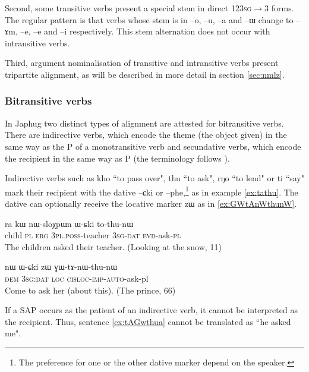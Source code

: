 \documentclass[oldfontcommands,oneside,a4paper,11pt]{article}
\newcommand{\ipa}[1]{{\phon #1}} %
\begin{document}
Second, 
  some transitive verbs present a special stem in direct \textsc{123sg}$\rightarrow$3 forms. The regular pattern is that verbs whose stem is in --\ipa{o}, --\ipa{u}, --\ipa{a} and --\ipa{ɯ} change to --\ipa{ɤm}, --\ipa{e}, --\ipa{e} and --\ipa{i} respectively. This stem alternation does not occur with intransitive verbs.

Third, argument nominalisation of transitive   and intransitive  verbs present tripartite alignment, as will be described in more detail in section  \ref{sec:nmlz}.

\subsubsection{Bitransitive verbs} \label{sec:bitr}
 In Japhug two distinct types of alignment are attested for bitransitive verbs. There are indirective verbs, which encode the theme (the object given) in the same way as the P of a monotransitive verb and secundative verbs, which encode the recipient in the same way as P (the terminology follows \citealt{malchukov10ditransitive}).

Indirective verbs such as \ipa{kho} ``to pass over", \ipa{thu} ``to ask", \ipa{rŋo} ``to lend" or \ipa{ti} ``say" mark their recipient with the dative \ipa{--ɕki} or \ipa{--phe},\footnote{The preference for one or the other dative marker depend on the speaker.} as in example \ref{ex:tathu}. The dative can optionally receive the locative marker \ipa{zɯ} as in \ref{ex:GWtAnWthunW}.
 \begin{exe}
   \ex   \label{ex:tathu}
 \gll \ipa{tɤpɤtso}  	\ipa{ra}  	\ipa{kɯ}  	\ipa{nɯ-sloχpɯn}  	\ipa{ɯ-ɕki}  	\ipa{to-thu-nɯ}  \\
child \textsc{pl} \textsc{erg} \textsc{3pl.poss}-teacher \textsc{3sg-dat} \textsc{evd}-ask-\textsc{pl} \\
\glt The children asked their teacher. (Looking at the snow, 11)
   \end{exe}  

 \begin{exe}
   \ex   \label{ex:GWtAnWthunW}
 \gll
\ipa{nɯ}  	\ipa{ɯ-ɕki}  	\ipa{zɯ}  	\ipa{ɣɯ-tɤ-nɯ-thu-nɯ}  \\
\textsc{dem } \textsc{3sg:dat} \textsc{loc} \textsc{cisloc-imp-auto}-ask-pl \\
\glt Come to ask her (about this). (The prince, 66)
   \end{exe}  

If a  SAP occurs as the patient of an indirective verb, it cannot be interpreted as the recipient. Thus, sentence \ref{ex:tAGwthua} cannot be translated as ``he asked me".
\end{document}
